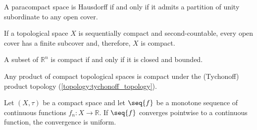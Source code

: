     \begin{property}\label{topology:paracompact_partition_unity}
        A paracompact space is Hausdorff if and only if it admits a partition of unity subordinate to any open cover.
    \end{property}



    \begin{theorem}\label{topology:heine_borel}
        If a topological space $X$ is sequentially compact and second-countable, every open cover has a finite subcover and, therefore, $X$ is compact.
    \end{theorem}
    \begin{result}
        A subset of $\mathbb{R}^n$ is compact if and only if it is closed and bounded.
    \end{result}

    \begin{theorem}
        Any product of compact topological spaces is compact under the (Tychonoff) product topology (\cref{topology:tychonoff_topology}).
    \end{theorem}



    \begin{theorem}[Dini]
        Let $(X,\tau)$ be a compact space and let $\seq{f}$ be a monotone sequence of continuous functions $f_n:X\rightarrow\mathbb{R}$. If $\seq{f}$ converges pointwise to a continuous function, the convergence is uniform.
    \end{theorem}


